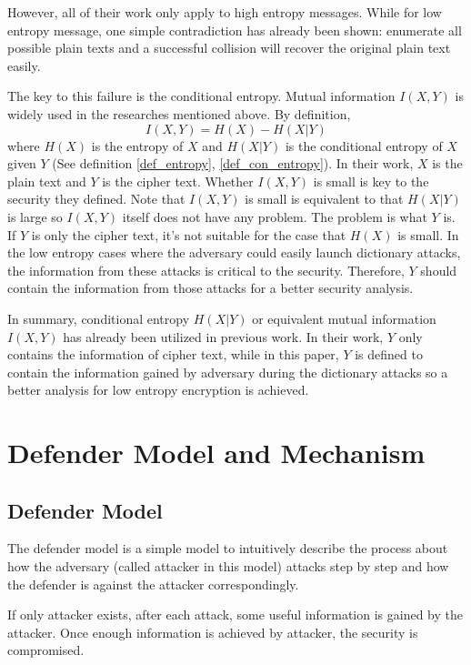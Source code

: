 \documentclass[10pt, conference, compsocconf]{IEEEtran}
\begin{document}
    However, all of their work only apply to high entropy messages.
    While for low entropy message,
    one simple contradiction has already been
    shown: enumerate all possible plain texts and a successful collision
    will recover the original plain text easily.

    The key to this failure is the conditional entropy. Mutual information
    $I(X, Y)$ is widely used in the researches mentioned above. By definition,
    \begin{equation}
        I(X, Y) = H(X) - H(X|Y)
    \end{equation}
    where $H(X)$ is the entropy of $X$ and $H(X|Y)$ is the conditional entropy
    of $X$ given $Y$ (See definition \ref{def_entropy}, \ref{def_con_entropy}).
    In their work, $X$ is the plain text and $Y$ is the cipher text.
    Whether $I(X, Y)$ is small is key to the security they defined.
    Note that $I(X, Y)$ is small
    is equivalent to that $H(X|Y)$ is large so $I(X, Y)$ itself does not have any problem.
    The problem is what $Y$ is.
    If $Y$ is only the cipher text, it's not suitable for the case that $H(X)$ is small.
    In the low entropy cases where the adversary could easily launch dictionary attacks,
    the information from these attacks is critical to the security. Therefore, $Y$
    should contain the information from those attacks for a better security analysis.

    In summary, conditional entropy $H(X|Y)$ or equivalent mutual information $I(X, Y)$
    has already been utilized in previous work. In their work, $Y$ only
    contains the information of cipher text, while in this paper, $Y$ is defined to contain the information
    gained by adversary during the dictionary attacks so a better analysis
    for low entropy encryption is achieved.

\section{Defender Model and Mechanism}\label{sec_def}
    \subsection{Defender Model}
        The defender model is a simple model
        to intuitively describe the process about how the adversary
        (called attacker in this model) attacks step by step
        and how the defender is against the attacker correspondingly.
		
		If only attacker exists,
		after each attack, some useful information is gained by the attacker.
        Once enough information is achieved by attacker,
        the security is compromised.
\end{document}
